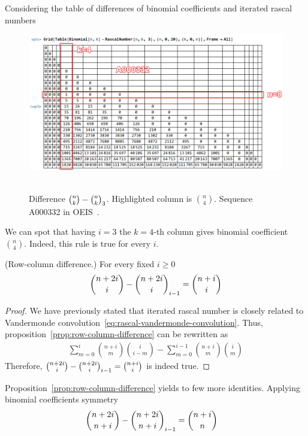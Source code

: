 Considering the table of differences of binomial coefficients and iterated rascal numbers
\begin{figure}[H]
    \centering
    \includegraphics[width=1\textwidth]{../img/01_Difference_Binomial_Rascal_i_3_BinomialCoefficients}
    ~\caption{Difference $\binom{n}{k}-\binom{n}{k}_{3}$.
    Highlighted column is $\binom{n}{4}$.
    Sequence A000332 in OEIS~\cite{sloane2009binomial}.}
    \label{fig:difference-binomial-rascal-i-3}
\end{figure}
We can spot that having $i=3$ the $k=4$-th column gives binomial coefficient $\binom{n}{4}$.
Indeed, this rule is true for every $i$.
\begin{proposition}
    \label{prop:row-column-difference}
    (Row-column difference.) For every fixed $i\geq0$
    \begin{align*}
        \binom{n+2i}{i} - \binom{n+2i}{i}_{i-1} = \binom{n+i}{i}
    \end{align*}
    \begin{proof}
        We have previously stated that iterated rascal number is
        closely related to Vandermonde convolution~\eqref{eq:rascal-vandermonde-convolution}.
        Thus, proposition~\eqref{prop:row-column-difference} can be rewritten as
        \begin{align*}
            \sum_{m=0}^{i} \binom{n+i}{m} \binom{i}{i-m} - \sum_{m=0}^{i-1} \binom{n+i}{m} \binom{i}{m}
        \end{align*}
        Therefore, $\binom{n+2i}{i} - \binom{n+2i}{i}_{i-1} = \binom{n+i}{i}$ is indeed true.
    \end{proof}
\end{proposition}
Proposition~\eqref{prop:row-column-difference} yields to few more identities.
Applying binomial coefficients symmetry
\begin{align*}
    \binom{n+2i}{n+i} - \binom{n+2i}{n+i}_{i-1} &= \binom{n+i}{n}
\end{align*}
